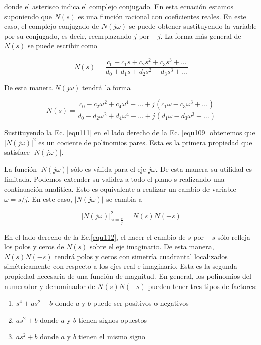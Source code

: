 \documentclass[12pt]{book}
\theoremstyle{definition}
\theoremstyle{remark}
\theoremstyle{plain}
\begin{document}
donde el asterisco indica el complejo conjugado. En esta ecuación estamos suponiendo que $N(s)$ es una función racional con coeficientes reales. En este caso, el complejo conjugado de $N(j\omega)$ se puede obtener sustituyendo  la variable por su conjugado, es decir, reemplazando $j$ por $-j$. La forma más general de $N(s)$ se puede escribir como

\begin{equation}
N(s) = \frac{c_0+c_1 s + c_2 s^2+ c_3 s^3+...}{d_0+d_1 s+d_2 s^2+d_3 s^3+...}
\label{equ110}
\end{equation}

De esta manera $N(j\omega)$ tendrá la forma

\begin{equation}
N(s) = \frac{c_0-c_2 \omega^2 + c_4 \omega^4-...+j(c_1 \omega - c_3\omega ^3+...)}{d_0-d_2 \omega ^2+d_4 \omega ^4-...+j(d_1 \omega - d_3 \omega ^3+...)}
\label{equ111}
\end{equation}

Sustituyendo la Ec. \ref{equ111} en el lado derecho de la Ec. \ref{equ109} obtenemos que $|N(j\omega)|^ 2$ es un cociente de polinomios pares. Esta es la primera propiedad que satisface $|N(j\omega)|$.

La función $|N(j\omega)|$ sólo es válida para el eje $j\omega$. De esta manera su utilidad es limitada. Podemos extender su validez a todo el plano s realizando una continuación analítica. Esto es equivalente a realizar un cambio de variable $\omega= s /j$. En este caso, $|N(j\omega)|$ se cambia a

\begin{equation}
|N(j\omega)| ^2_{\omega = \frac{s}{j}}= N(s) N(-s)
\label{equ112}
\end{equation}

En el lado derecho de la Ec.\ref{equ112}, el hacer el cambio de $s$ por $-s$ sólo refleja los polos y ceros de $N(s)$ sobre el eje imaginario. De esta manera, $N(s)N(-s)$ tendrá polos y ceros con simetría cuadrantal localizados simétricamente con respecto a los ejes real e imaginario. Esta es la segunda propiedad necesaria de una función de magnitud. En general, los polinomios del numerador y denominador de $N(s)N(-s)$ pueden tener tres tipos de factores:

\begin{enumerate}
\item $s^4+ a s^2+b$ donde $a$ y $b$ puede ser positivos o negativos
\item $a s^2+b$ donde $a$ y $b$ tienen signos opuestos
\item $a s^2+b$ donde $a$ y $b$ tienen el mismo signo
\end{enumerate}
\end{document}
